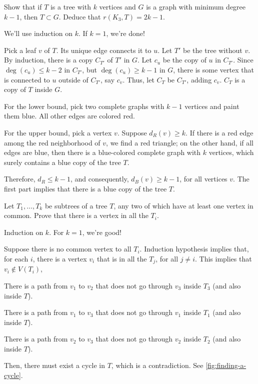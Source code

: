 \documentclass[10pt, a4paper]{article}
\begin{document}
\newpage
\begin{prob}\label{prob:4}
	Show that if $T$ is a tree with $k$ vertices and $G$ is a graph with minimum degree $k-1$, then $T \subset G$. Deduce that $r(K_3, T) = 2k-1$.
\end{prob}
\begin{sol}	
		We'll use induction on $k$. If $k = 1$, we're done!

		Pick a leaf $v$ of $T$. Its unique edge connects it to $u$. Let $T'$ be the tree without $v$. By induction, there is a copy $C_{T'}$ of $T'$ in $G$. Let $c_u$ be the copy of  $u$ in $C_{T'}$. Since $\deg(c_u) \leqslant k - 2$ in $C_{T'}$, but $\deg(c_u) \geqslant k-1$ in $G$, there is some vertex that is connected to $u$ outside of $C_{T'}$, say $c_v$. Thus, let $C_{T}$ be $C_{T'}$, adding $c_v$. $C_{T}$ is a copy of $T$ inside $G$.
\end{sol}
\begin{sol}
	For the lower bound, pick two complete graphs with $k-1$ vertices and paint them blue. All other edges are colored red.

	For the upper bound, pick a vertex $v$. Suppose $d_R(v) \geqslant k$. If there is a red edge among the red neighborhood of $v$, we find a red triangle; on the other hand, if all edges are blue, then there is a blue-colored complete graph with $k$ vertices, which surely contains a blue copy of the tree $T$. 

	Therefore, $d_R \leqslant k - 1$, and consequently, $d_B(v) \geqslant k -1$, for all vertices $v$. The first part implies that there is a blue copy of the tree $T$.
\end{sol}

\newpage
\begin{prob}
	Let $T_1, \dots, T_k$ be subtrees of a tree $T$, any two of which have at least one vertex in common. Prove that there is a vertex in all the $T_i$.
\end{prob}
\begin{sk}
	Induction on $k$. For $k = 1$, we're good!

	Suppose there is no common vertex to all $T_i$.
	Induction hypothesis implies that, for each $i$, there is a vertex $v_i$ that is in all the $T_j$, for all $j \neq i$.
	This implies that $v_i \not\in V(T_i)$,

	There is a path from $v_1$ to $v_2$ that does not go through $v_3$ inside $T_3$ (and also inside $T$).

	There is a path from $v_1$ to $v_3$ that does not go through $v_1$ inside $T_1$ (and also inside $T$).

	There is a path from $v_2$ to $v_3$ that does not go through $v_2$ inside $T_2$ (and also inside $T$).

	Then, there must exist a cycle in $T$, which is a contradiction. See \cref{fig:finding-a-cycle}.
\end{sk}
\end{document}

